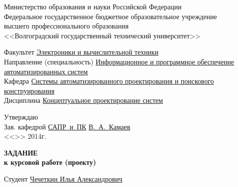 \begin{titlepage}
    \begin{center}
        Министерство образования и науки Российской Федерации \\
        Федеральное государственное бюджетное образовательное учреждение\\
        высшего профессионального образования\\
        <<Волгоградский государственный технический университет>>\\
    \end{center}
    Факультет \underline{\hspace{1cm}Электроники и вычислительной техники\hspace{4.75cm}}\\
    Направление (специальность) \underline{Информационное и программное обеспечение\hspace{0.2cm}}\\
    \underline{автоматизированных систем\hspace{10.8cm}}\\
    Кафедра \underline{\hspace{1.4cm}Системы автоматизированного проектирования и поискового\hspace{0.3cm}}\\
    \underline{конструирования\hspace{13.3cm}}\\
    Дисциплина \underline{\hspace{1cm}Концептуальное проектирование систем}
    \begin{flushright}
        Утверждаю\\
        Зав. кафедрой \underline{САПР~и~ПК} \hspace{0.2cm} \underline{В.~А.~Камаев} \\
        <<\underline{\hspace{2cm}}>>\underline{\hspace{5cm}} 2014г.
    \end{flushright}
    \begin{center}
        \large \MakeUppercase{\textbf{задание}} \\
        \normalsize\vspace{-0.2cm}\textbf{к курсовой работе (проекту)}
    \end{center}
    Студент \underline{\hspace{1cm}Чечеткин Илья Александрович\hspace{2cm}} \\[-.2cm]

\end{titlepage}
